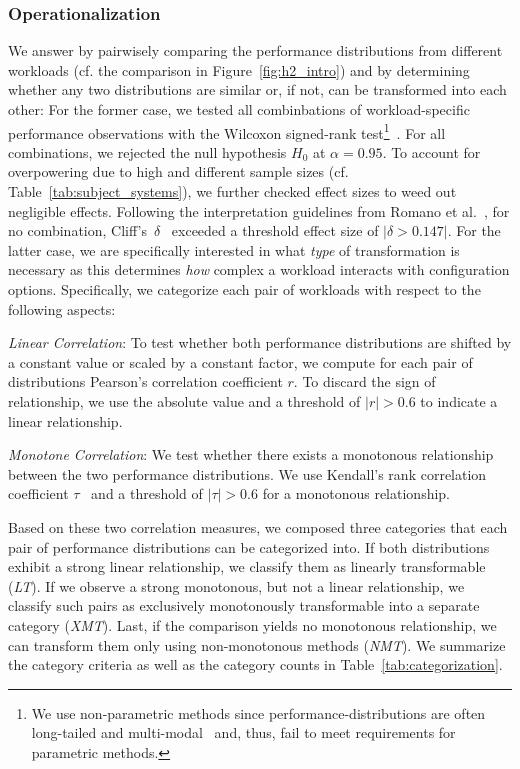 {\subsubsection{Operationalization}
We answer  by pairwisely comparing the performance distributions from different workloads (cf. the comparison in Figure~\ref{fig:h2_intro}) and by determining whether any two distributions are similar or, if not, can be transformed into each other: For the former case, we tested all combinbations of workload-specific performance observations with the Wilcoxon signed-rank test\footnote{We use non-parametric methods since performance-distributions are often long-tailed and multi-modal~\cite{curtsinger_stabilizer_2013,maricq2018taming} and, thus, fail to meet requirements for parametric methods.}~\cite{lovric_international_2010}. For all combinations, we rejected the null hypothesis $H_0$ at $\alpha=0.95$. To account for overpowering due to high and different sample sizes (cf. Table~\ref{tab:subject_systems}), we further checked effect sizes to weed out negligible effects. Following the interpretation guidelines from Romano et al.~\cite{romano2006exploring}, for no combination, Cliff's~$\delta$~\cite{Cliff1993DominanceSO} exceeded a threshold effect size of $\vert\delta > 0.147\vert$.
For the latter case, we are specifically interested in what \textit{type} of transformation is necessary as this determines \textit{how} complex a workload interacts with configuration options. Specifically, we categorize each pair of workloads with respect to the following aspects: 

\begin{compactenum}

	\item \textit{Linear Correlation}: To test whether both performance distributions are shifted by a constant value or scaled by a constant factor, we compute for each pair of distributions Pearson's correlation coefficient $r$. To discard the sign of relationship, we use the absolute value and a threshold of $\vert r\vert >0.6$ to indicate a linear relationship.
	
	\item \textit{Monotone Correlation}: We test whether there exists a monotonous relationship between the two performance distributions. We use Kendall's rank correlation coefficient $\tau$~\cite{kendall1938new} and a threshold of  $\vert\tau\vert > 0.6$ for a monotonous relationship.
\end{compactenum}
{\color{black}Based on these two correlation measures, we composed three categories that each pair of performance distributions can be categorized into.
If both distributions exhibit a strong linear relationship, we classify them as linearly transformable (\textit{\colorbox{lt-color}{LT}}). If we observe a strong monotonous, but not a linear relationship, we classify such pairs as exclusively monotonously transformable into a separate category (\textit{\colorbox{xmt-color}{XMT}}). Last, if the comparison yields no monotonous relationship, we can transform them only using non-monotonous methods (\textit{\colorbox{nmt-color}{NMT}}). 
We summarize the category criteria as well as the category counts in Table~\ref{tab:categorization}. 

}}
